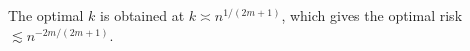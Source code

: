 \documentclass[11pt,a4paper]{ctexart}
\numberwithin{equation}{section}%
\begin{document}
The optimal $ k $ is obtained at $ k\asymp n^{1/(2m+1)} $, which gives the optimal risk $ \lesssim  n^{-2m/(2m+1)} $.














    


    





    
\end{document}
